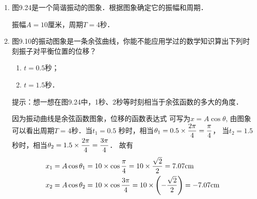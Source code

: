 \begin{enumerate}
    \item 图9.24是一个简谐振动的图象．根据图象确定它的振幅和周期．
    \begin{figure}[htp]\centering
        \caption{}
    \end{figure}

    \begin{solution}
        振幅$A=10$厘米，周期$T=4$秒．
    \end{solution}
    \item 图9.10的振动图象是一条余弦曲线，你能不能应用学过的数学知识算出下列时刻振子对平衡位置的位移？
    \begin{enumerate}
        \item $t=0.5$秒；
        \item $t=1.5$秒．
    \end{enumerate}

    提示：想一想在图9.24中，1秒、2秒等时刻相当于余弦函数的多大的角度．

    \begin{solution}
因为振动曲线是余弦函数图象，位移的函数表达式
可写为$x=A\cos\theta$, 由图象可以看出周期$T=4$秒．当$t_1=0.5$
秒时，相当$\theta_1=0.5\times\dfrac{2\pi}{4}=\dfrac{\pi}{4}$，
当$t_2=1.5$秒时，相当$\theta_2=1.5\times\dfrac{2\pi}{4}=\dfrac{3\pi}{4}$．
故有
\[\begin{split}
    x_1&=A\cos\theta_1=10\times\cos\frac{\pi}{4}=10\times \frac{\sqrt{2}}{2}=7.07{\rm cm}\\
    x_2&=A\cos\theta_2=10\times\cos\frac{3\pi}{4}=10\times \left(-\frac{\sqrt{2}}{2}\right)=-7.07{\rm cm}\\
\end{split}\]
    \end{solution}
\end{enumerate}



